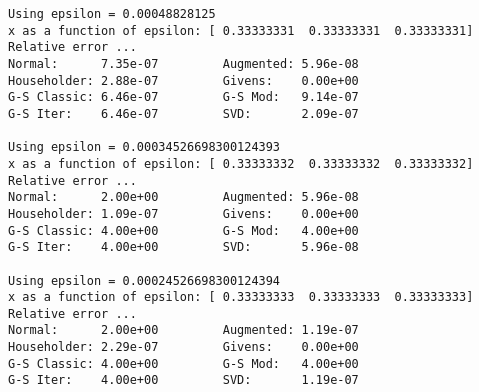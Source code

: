 \documentclass[paper=a4, fontsize=11pt]{scrartcl}
\numberwithin{equation}{section}		%
\numberwithin{figure}{section}			%
\numberwithin{table}{section}				%
\begin{document}
\begin{verbatim}
Using epsilon = 0.00048828125
x as a function of epsilon: [ 0.33333331  0.33333331  0.33333331]
Relative error ...
Normal:      7.35e-07         Augmented: 5.96e-08
Householder: 2.88e-07         Givens:    0.00e+00
G-S Classic: 6.46e-07         G-S Mod:   9.14e-07
G-S Iter:    6.46e-07         SVD:       2.09e-07

Using epsilon = 0.00034526698300124393
x as a function of epsilon: [ 0.33333332  0.33333332  0.33333332]
Relative error ...
Normal:      2.00e+00         Augmented: 5.96e-08
Householder: 1.09e-07         Givens:    0.00e+00
G-S Classic: 4.00e+00         G-S Mod:   4.00e+00
G-S Iter:    4.00e+00         SVD:       5.96e-08

Using epsilon = 0.00024526698300124394
x as a function of epsilon: [ 0.33333333  0.33333333  0.33333333]
Relative error ...
Normal:      2.00e+00         Augmented: 1.19e-07
Householder: 2.29e-07         Givens:    0.00e+00
G-S Classic: 4.00e+00         G-S Mod:   4.00e+00
G-S Iter:    4.00e+00         SVD:       1.19e-07
\end{verbatim}














\end{document}
